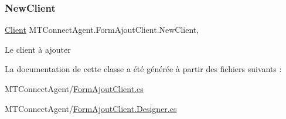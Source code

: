 \subsubsection{\texorpdfstring{New\+Client}{NewClient}}
{\footnotesize\ttfamily \mbox{\hyperlink{class_m_t_connect_agent_1_1_model_1_1_client}{Client}} M\+T\+Connect\+Agent.\+Form\+Ajout\+Client.\+New\+Client\hspace{0.3cm}{\ttfamily [get]}, {\ttfamily [set]}}



Le client à ajouter 



La documentation de cette classe a été générée à partir des fichiers suivants \+:\begin{DoxyCompactItemize}
\item 
M\+T\+Connect\+Agent/\mbox{\hyperlink{_form_ajout_client_8cs}{Form\+Ajout\+Client.\+cs}}\item 
M\+T\+Connect\+Agent/\mbox{\hyperlink{_form_ajout_client_8_designer_8cs}{Form\+Ajout\+Client.\+Designer.\+cs}}\end{DoxyCompactItemize}
